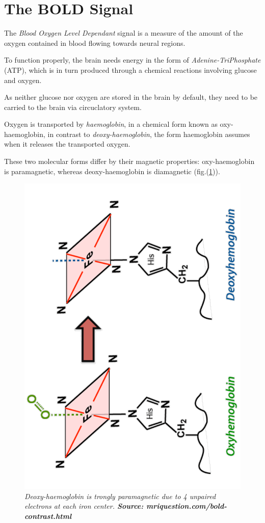\documentclass[12pt,openright,twoside,a4paper]{book}
\begin{document}
\section{The BOLD Signal}

The \textit{Blood Oxygen Level Dependant} signal  is a measure of the amount of the oxygen contained in blood flowing towards neural regions.

To function properly, the brain needs energy in the form of \textit{Adenine-TriPhosphate} (ATP), which is in turn produced through a chemical reactions involving glucose and oxygen.

As neither glucose nor oxygen are stored in the brain by default, they need to be carried to the brain via circuclatory system. 

Oxygen is transported by \textit{haemoglobin}, in a chemical form  known as oxy-haemoglobin, in contrast to \textit{deoxy-haemoglobin}, the form haemoglobin assumes when it releases the transported oxygen.

These two molecular forms differ by their magnetic properties: oxy-haemoglobin is paramagnetic, whereas deoxy-haemoglobin is diamagnetic (fig.(\ref{haemo})).

\begin{figure}[!h]
\centering
\includegraphics[scale=0.3, angle=270]{haemo}
\caption{\textit{ Deoxy-haemoglobin is trongly paramagnetic due to 4 unpaired electrons at each iron center. \textbf{Source: mriquestion.com/bold-contrast.html}}}
\label{haemo}
\end{figure}
\end{document}
